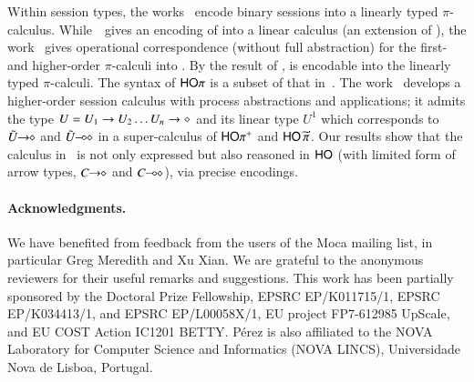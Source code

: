 \documentclass[runningheads]{llncs}
\begin{document}
{Within session types, the works~\cite{DemangeonH11,Dardha:2012:STR:2370776.2370794} 
encode binary sessions into a linearly typed $\pi$-calculus. 
While~\cite{DemangeonH11}~gives an encoding of \sessp into a linear calculus 
(an extension of \cite{BHY}),  
the work~\cite{Dardha:2012:STR:2370776.2370794} 
gives  operational correspondence (without full abstraction)
for the first- and higher-order 
$\pi$-calculi into \cite{LinearPi}. 
By the result of \cite{DemangeonH11}, 
\HOpp is encodable  into the linearly typed $\pi$-calculi.     
The syntax of $\mathsf{HO}\pi$ is a subset of that in~\cite{tlca07,MostrousY15}.
The work~\cite{tlca07} develops a higher-order session calculus
with process abstractions and applications; it admits the type 
$U=U_1 \rightarrow U_2 \dots U_n \rightarrow \diamond$ and its linear type 
$U^1$
which corresponds to $\tilde{U}\!\! \rightarrow\!\! \diamond$ and $\tilde{U}\!\! \multimap\!\! \diamond$ in 
a super-calculus of $\mathsf{HO\pi^{+}}$ and $\mathsf{HO}\,{\widetilde{\pi}}$. 
Our results show that
the calculus in~\cite{tlca07} is not only expressed but 
also reasoned in 
$\mathsf{HO}$ (with limited form of arrow types, $C\!\! \rightarrow\!\! \diamond$ and $C\!\! \multimap\!\! \diamond$), via precise encodings. 

\paragraph{Acknowledgments.}
We have benefited from feedback from the users of the Moca mailing list, in particular Greg Meredith and Xu Xian.
We are grateful to the anonymous reviewers for their useful remarks and suggestions.
This work has been partially sponsored by the Doctoral Prize Fellowship, EPSRC EP/K011715/1, EPSRC EP/K034413/1, and EPSRC EP/L00058X/1, EU project FP7-612985 UpScale, and EU COST Action IC1201 BETTY. P\'{e}rez is also affiliated to the NOVA Laboratory for Computer Science and Informatics (NOVA LINCS), Universidade Nova de Lisboa, Portugal.
 
}
\end{document}
